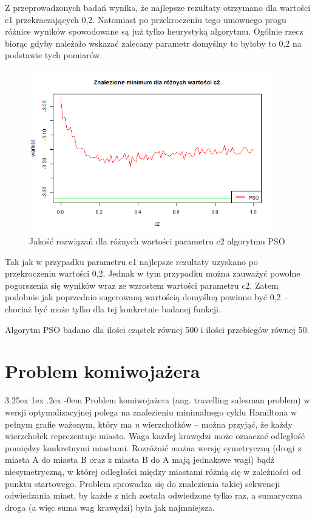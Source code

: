 \documentclass[11pt, a4paper]{article}
\makeatletter
\newcommand{\fbi}{\leavevmode{\parindent=1em\indent}}
\renewcommand\paragraph{\@startsection{paragraph}{5}{\z@}
  {3.25ex \@plus1ex \@minus.2ex}
  {-0em}
  {\normalfont\normalsize\bfseries}}
\makeatother
\begin{document}
\fbi
Z przeprowadzonych badań wynika, że najlepsze rezultaty otrzymano dla wartości c1 przekraczających 0,2. Natomiast po przekroczeniu tego umownego progu różnice wyników spowodowane są już tylko heurystyką algorytmu. Ogólnie rzecz biorąc gdyby należało wskazać zalecany parametr domyślny to byłoby to 0,2 na podstawie tych pomiarów.

\begin{figure}[H]
	\centering
	\includegraphics[width=0.95\textwidth]{./assets/Hartman6c2.png}
	\caption{Jakość rozwiązań dla różnych wartości parametru c2 algorytmu PSO}
	\label{fig:psoc2}
\end{figure}

\fbi
Tak jak w przypadku parametru c1 najlepsze rezultaty uzyskano po przekroczeniu wartości 0,2. Jednak w tym przypadku można zauważyć powolne pogorszenia się wyników wraz ze wzrostem wartości parametru c2. Zatem podobnie jak poprzednio sugerowaną wartością domyślną powinno być 0,2 -- chociaż być może tylko dla tej konkretnie badanej funkcji.

\fbi
Algorytm PSO badano dla ilości cząstek równej 500 i ilości przebiegów równej 50.

\newpage
\section{Problem komiwojażera}
\paragraph{}
Problem komiwojażera (ang. travelling salesman problem) w wersji optymalizacyjnej polega na znalezieniu minimalnego cyklu Hamiltona w pełnym grafie ważonym, który ma \textit{n} wierzchołków -- można przyjąć, że każdy wierzchołek reprezentuje miasto. Waga każdej krawędzi może oznaczać odległość pomiędzy konkretnymi miastami. Rozróżnić można wersję symetryczną (drogi z miasta A do miasta B oraz z miasta B do A mają jednakowe wagi) bądź niesymetryczną, w której odległości między miastami różnią się w zależności od punktu startowego. Problem sprowadza się do znalezienia takiej sekwencji odwiedzania miast, by każde z nich została odwiedzone tylko raz, a sumaryczna droga (a więc suma wag krawędzi) była jak najmniejsza.
\end{document}
